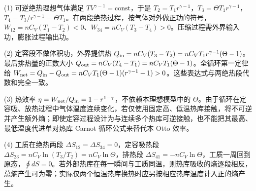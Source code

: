 (1) 可逆绝热理想气体满足 \(TV^{\gamma-1}=\mathrm{const}\)，于是 \(T_2=T_1r^{\gamma-1}\)，\(T_3=\Theta T_1r^{\gamma-1}\)，\(T_4=T_3/r^{\gamma-1}=\Theta T_1\)。在两段绝热过程，按气体对外做正功的符号，\(W_{12}=nC_V(T_1-T_2)<0\)、\(W_{34}=nC_V(T_3-T_4)>0\)。压缩过程需外界输入功，膨胀过程输出功。

(2) 定容段不做体积功，外界提供热 \(Q_{\rm in}=nC_V(T_3-T_2)=nC_V T_1r^{\gamma-1}(\Theta-1)\)。最后排热量的正数大小 \(Q_{\rm out}=nC_V(T_4-T_1)=nC_VT_1(\Theta-1)\)。全循环第一定律给 \(W_{\rm net}=Q_{\rm in}-Q_{\rm out}=nC_VT_1(\Theta-1)(r^{\gamma-1}-1)>0\)。这些表达式与两绝热段代数和完全一致。

(3) 热效率 \(\eta=W_{\rm net}/Q_{\rm in}=1-r^{1-\gamma}\)，不依赖本理想模型中的 \(\Theta\)。由于循环在定容吸、放热过程中气体温度连续变化，若仅使用固定高、低温热库接触，将不可逆并产生额外熵；即使定容过程设计为与连续多个热库可逆接触，也不能把其最高、最低温度代进单对热库 Carnot 循环公式来替代本 Otto 效率。

(4) 工质在绝热两段 \(\Delta S_{12}=\Delta S_{34}=0\)，定容吸热段 \(\Delta S_{23}=nC_V\ln(T_3/T_2)=nC_V\ln\Theta\)，排热段 \(\Delta S_{41}=-nC_V\ln\Theta\)，工质一周回到原态，\(\oint dS=0\)。若外部热库在每一瞬间与工质同温，则热库吸收的熵逐段相反，总熵产生可为零；实际仅两个恒温热库换热时应另按相应热库温度计入正的熵产生。
